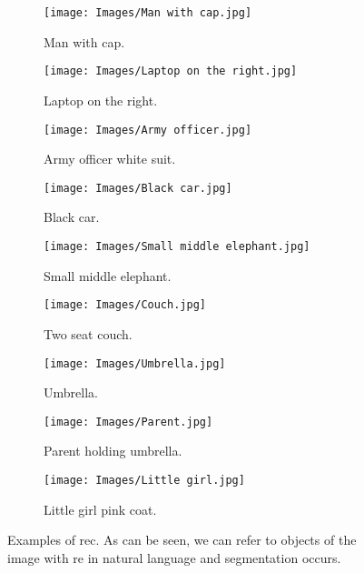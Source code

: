 \begin{figure}[tp]
  \centering
  \begin{subfigure}[t]{.32\textwidth}
    \centering
    \caption{Man with cap.}
    \label{fig:rec-man}
    \texttt{[image: Images/Man with cap.jpg]}
  \end{subfigure}\hfill
  \begin{subfigure}[t]{.32\textwidth}
    \centering
    \caption{Laptop on the right.}
    \label{fig:rec-laptop}
    \texttt{[image: Images/Laptop on the right.jpg]}
  \end{subfigure}\hfill
  \begin{subfigure}[t]{.32\textwidth}
    \centering
    \caption{Army officer white suit.}
    \label{fig:rec-army}
    \texttt{[image: Images/Army officer.jpg]}
  \end{subfigure}

  \bigskip
  \begin{subfigure}[t]{.32\textwidth}
    \centering
    \caption{Black car.}
    \label{fig:rec-car}
    \texttt{[image: Images/Black car.jpg]}
  \end{subfigure}\hfill
  \begin{subfigure}[t]{.32\textwidth}
    \centering
    \caption{Small middle elephant.}
    \label{fig:rec-elephant}
    \texttt{[image: Images/Small middle elephant.jpg]}
  \end{subfigure}\hfill
  \begin{subfigure}[t]{.32\textwidth}
    \centering
    \caption{Two seat couch.}
    \label{fig:rec-couch}
    \texttt{[image: Images/Couch.jpg]}
  \end{subfigure}

  \bigskip
  \begin{subfigure}[t]{.32\textwidth}
    \centering
    \caption{Umbrella.}
    \label{fig:rec-umbrella}
    \texttt{[image: Images/Umbrella.jpg]}
  \end{subfigure}\hfill
  \begin{subfigure}[t]{.32\textwidth}
    \centering
    \caption{Parent holding umbrella.}
    \label{fig:rec-parent}
    \texttt{[image: Images/Parent.jpg]}
  \end{subfigure}\hfill
  \begin{subfigure}[t]{.32\textwidth}
    \centering
    \caption{Little girl pink coat.}
    \label{fig:rec-girl}
    \texttt{[image: Images/Little girl.jpg]}
  \end{subfigure}
  \caption[Examples of \acl*{rec}]{Examples of \acl{rec}. As can be seen, we
    can refer to objects of the image with \gls{re} in natural language and
    segmentation occurs.}
  \label{fig:rec-examples}
\end{figure}


